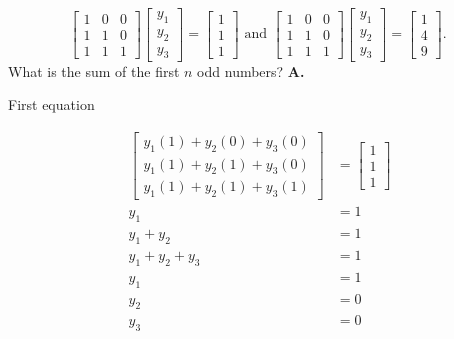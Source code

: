 \documentclass[main.tex]{subfiles}
\begin{document}
\begin{enumerate}
        $$
        \left[\begin{array}{lll}
        1 & 0 & 0 \\
        1 & 1 & 0 \\
        1 & 1 & 1
        \end{array}\right]\left[\begin{array}{l}
        y_{1} \\
        y_{2} \\
        y_{3}
        \end{array}\right]=\left[\begin{array}{l}
        1 \\
        1 \\
        1
        \end{array}\right] \text { and }\left[\begin{array}{lll}
        1 & 0 & 0 \\
        1 & 1 & 0 \\
        1 & 1 & 1
        \end{array}\right]\left[\begin{array}{l}
        y_{1} \\
        y_{2} \\
        y_{3}
        \end{array}\right]=\left[\begin{array}{l}
        1 \\
        4 \\
        9
        \end{array}\right] \text {. }
        $$
        What is the sum of the first $n$ odd numbers? \textbf{A.}
        
        First equation
        
        $$
        \begin{aligned}
        \left[\begin{array}{l}
        y_{1}(1)+y_{2}(0)+y_{3}(0) \\
        y_{1}(1)+y_{2}(1)+y_{3}(0) \\
        y_{1}(1)+y_{2}(1)+y_{3}(1)
        \end{array}\right] & = \left[\begin{array}{l}
        1 \\
        1 \\
        1
        \end{array}\right]\\
        y_{1} & =1 \\
        y_{1}+y_{2} & = 1 \\
        y_{1}+y_{2}+y_{3} & = 1 \\
        y_{1} & = 1 \\
        y_{2} & = 0 \\
        y_{3} & = 0
        \end{aligned}
        $$
        

\end{enumerate}
\end{document}
